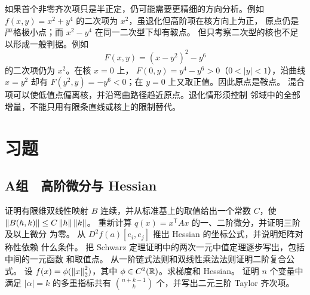 如果首个非零齐次项只是半正定，仍可能需要更精细的方向分析。例如
\(f(x,y)=x^2+y^4\) 的二次项为 \(x^2\)，虽退化但高阶项在核方向上为正，
原点仍是严格极小点；而 \(x^2-y^4\) 在同一二次型下却有鞍点。
但只考察二次型的核也不足以形成一般判据。例如
\[
 F(x,y)=(x-y^2)^2-y^6
\]
的二次项仍为 \(x^2\)。在核 \(x=0\) 上，
\(F(0,y)=y^4-y^6>0\)（\(0<|y|<1\)），沿曲线 \(x=y^2\) 却有
\(F(y^2,y)=-y^6<0\)；在 \(y=0\) 上又取正值。因此原点是鞍点。
混合项可以使低值点偏离核，并沿弯曲路径趋近原点。退化情形须控制
邻域中的全部增量，不能只用有限条直线或核上的限制替代。

\section*{习题}

\subsection*{A组　高阶微分与 Hessian}
\begin{enumerate}[label=\textbf{\thechapter.\arabic*.}]
 证明有限维双线性映射 \(B\) 连续，并从标准基上的取值给出一个常数
 \(C\)，使 \(\left\lVert B(h,k)\right\rVert\le C\left\lVert h\right\rVert\left\lVert k\right\rVert\)。
 重新计算 \(q(x)=x^{\mathsf T}Ax\) 的一、二阶微分，并证明三阶及以上微分
 为零。
 从 \(D^2f(a)[e_i,e_j]\) 推出 Hessian 的坐标公式，并说明矩阵对称性依赖
 什么条件。
 把 Schwarz 定理证明中的两次一元中值定理逐步写出，包括中间的一元函数
 和取值点。
 从一阶链式法则和双线性乘法法则证明二阶复合公式。
 设 \(f(x)=\phi(\left\lVert x\right\rVert_2^2)\)，其中 \(\phi\in C^2(\mathbb{R})\)。求梯度和
 Hessian。
 证明 \(n\) 个变量中满足 \(|\alpha|=k\) 的多重指标共有
 \(\binom{n+k-1}{k}\) 个，并写出二元三阶 Taylor 齐次项。
\end{enumerate}

